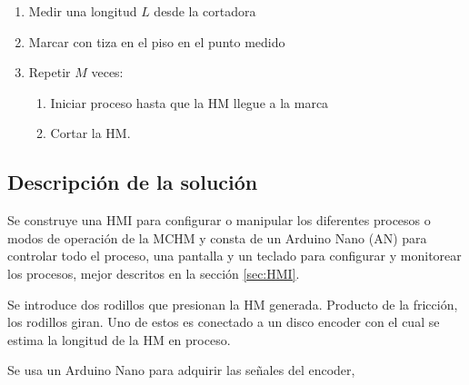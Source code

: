 \documentclass[main_conf.tex]{subfiles}
\begin{document}
\begin{enumerate}
\label{enum:intro:descripcion_maquina}
\item Medir una longitud $L$ desde la cortadora
\item Marcar con tiza en el piso en el punto medido
\item Repetir $M$ veces:
  \begin{enumerate}
    \item Iniciar proceso hasta que la HM llegue a la marca
    \item Cortar la HM.
  \end{enumerate}    
\end{enumerate}

\subsection{Descripción de la solución}
Se construye una HMI para configurar o manipular los  diferentes
procesos o modos de operación de la MCHM y consta de un Arduino
Nano (AN) para controlar todo el proceso, una pantalla
y un teclado para configurar y monitorear los procesos,
mejor descritos en la sección \ref{sec:HMI}.

Se introduce dos rodillos que presionan la HM generada.
Producto de la fricción, los rodillos giran. Uno de estos es conectado a
un disco encoder con el cual se estima la longitud de la HM en proceso.

Se usa un Arduino Nano para adquirir las señales del encoder,
\end{document}
